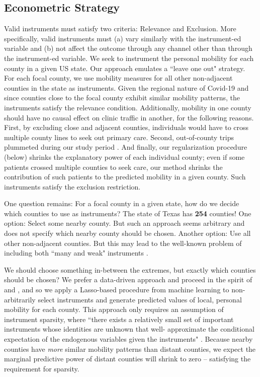  
\subsection{Econometric Strategy} \label{econ_strat}
 Valid instruments must satisfy two criteria: Relevance and Exclusion. More specifically, valid instruments must (a) vary similarly with the instrument-ed variable and (b) not affect the outcome through any channel other than through the instrument-ed variable. We seek to instrument the personal mobility for each county in a given US state. Our approach emulates a “leave one out" strategy. For each focal county, we use mobility measures for all other non-adjacent counties in the state as instruments. Given the regional nature of Covid-19 and since counties close to the focal county exhibit similar mobility patterns, the instruments satisfy the relevance condition. Additionally, mobility in one county should have no causal effect on clinic traffic in another, for the following reasons. First, by excluding close and adjacent counties, individuals would have to cross multiple county lines to seek out primary care. Second, out-of-county trips plummeted during our study period \citep{MTI2020}. And finally, our regularization procedure (below) shrinks the explanatory power of each individual county; even if some patients crossed multiple counties to seek care, our method shrinks the contribution of such patients to the predicted mobility in a given county. Such instruments satisfy the exclusion restriction.
 
 One question remains: For a focal county in a given state, how do we decide which counties to use as instruments? The state of Texas has \textbf{254} counties! One option: Select some nearby county. But such an approach seems arbitrary and does not specify which nearby county should be chosen. Another option: Use all other non-adjacent counties. But this may lead to the well-known problem of including both “many and weak" instruments \citep[p. 205]{Angrist2009}. 
 
 We should choose something in-between the extremes, but exactly which counties should be chosen? We prefer a data-driven approach and proceed in the spirit of \cite{Belloni2012} and \cite{Belloni2011}, and so we apply a Lasso-based procedure from machine learning to non-arbitrarily select instruments and generate predicted values of local, personal mobility for each county. This approach only requires an assumption of instrument sparsity, where “there exists a relatively small set of important instruments whose identities are unknown that well- approximate the conditional expectation of the endogenous variables given the instruments" \cite[p. 2370]{Belloni2012}. Because nearby counties have \textit{more} similar mobility patterns than distant counties, we expect the marginal predictive power of distant counties will shrink to zero -- satisfying the requirement for sparsity.
 
